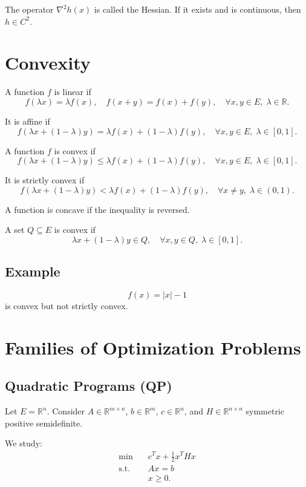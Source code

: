 \documentclass[12pt,oneside]{book}
\numberwithin{equation}{section}
\theoremstyle{definition}
\theoremstyle{plain}
\theoremstyle{remark}
\begin{document}
The operator $\nabla^2 h(x)$ is called the Hessian.  
If it exists and is continuous, then $h \in C^2$.

\section{Convexity}

A function $f$ is linear if
\[
f(\lambda x) = \lambda f(x), \quad
f(x+y) = f(x) + f(y),
\quad \forall x,y \in E,\; \lambda \in \mathbb{R}.
\]

It is affine if
\[
f(\lambda x + (1-\lambda)y)
= \lambda f(x) + (1-\lambda)f(y),
\quad \forall x,y \in E,\; \lambda \in [0,1].
\]

A function $f$ is convex if
\[
f(\lambda x + (1-\lambda)y)
\le \lambda f(x) + (1-\lambda)f(y),
\quad \forall x,y \in E,\; \lambda \in [0,1].
\]

It is strictly convex if
\[
f(\lambda x + (1-\lambda)y)
< \lambda f(x) + (1-\lambda)f(y),
\quad \forall x \ne y,\; \lambda \in (0,1).
\]

A function is concave if the inequality is reversed.

\medskip

A set $Q \subseteq E$ is convex if
\[
\lambda x + (1-\lambda)y \in Q,
\quad \forall x,y \in Q,\; \lambda \in [0,1].
\]

\subsection*{Example}

\[
f(x) = |x| - 1
\]
is convex but not strictly convex.

\section{Families of Optimization Problems}

\subsection{Quadratic Programs (QP)}

Let $E = \mathbb{R}^n$. Consider $A \in \mathbb{R}^{m \times n}$, $b \in \mathbb{R}^m$, $c \in \mathbb{R}^n$, and $H \in \mathbb{R}^{n \times n}$ symmetric positive semidefinite.

We study:
\[
\begin{aligned}
\min \quad & c^T x + \tfrac{1}{2} x^T H x \\
\text{s.t.} \quad & Ax = b \\
& x \ge 0.
\end{aligned}
\]
\end{document}
